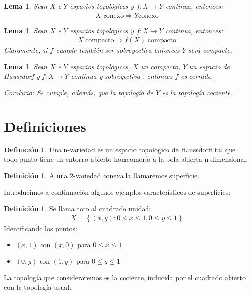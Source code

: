 \documentclass[a4paper,11pt,spanish, twoside, leqno]{tfg-uam}
\newtheorem{lema}[teor]{Lema}
\theoremstyle{definition}
\newtheorem{defin}[teor]{Definici\'on}
\begin{document}
\begin{lema}\label{lema:conexoAconexo}
	Sean $X$ e $Y$ espacios topológicos y $f: X \longrightarrow Y$ continua, entonces: 
	\begin{align*}
	X \textrm{ conexo} \Rightarrow Y \textrm{conexo}
	\end{align*}
\end{lema}


\begin{lema}\label{lema:compactoAcompacto}
	Sean $X$ e $Y$ espacios topológicos y $f: X \longrightarrow Y$ continua, entonces: 
	\begin{align*}
	X \textrm{ compacto} \Rightarrow f(X) \textrm{ compacto}
	\end{align*}
	Claramente, si $f$ cumple también ser sobreyectiva entonces $Y$ será compacto.
\end{lema} 



\begin{lema}\label{lema:XcompactoYt2fcontinua}
	Sean $X$ e  $Y$ espacios topológicos, $X$ un compacto, $Y$ un espacio de Haussdorf y $f: X \longrightarrow Y$ continua y sobreyectiva , entonces $f$ es cerrada.
	
	Corolario: Se cumple, además, que la topología de $Y$ es la topología cociente.
\end{lema}


\section{Definiciones}


\begin{defin}\label{defin:nvariedad}
	Una n-variedad es un espacio topológico de Haussdorff tal que todo punto tiene un entorno abierto homeomorfo a la bola abierta n-dimensional.
\end{defin}



\begin{defin}\label{defin:superficie}
	A una 2-variedad conexa la llamaremos superficie.
\end{defin}

Introducimos a continuación algunos ejemplos característicos de superficies:
\begin{defin}\label{defin:toro}
	Se llama toro al cuadrado unidad:
	\begin{align*}
		X = \left\{(x,y): 0\leq x\leq 1, 0\leq y\leq 1  \right\} 
	\end{align*}
	Identificando los puntos:
	\begin{itemize}
		\item 
		$(x,1)$ con $(x,0)$ para $0\leq x\leq 1$
		\item 
		$(0,y)$ con $(1,y)$ para $0\leq y\leq 1$
	\end{itemize}
La topología que consideraremos es la cociente, inducida por el cuadrado abierto con la topología usual.
\end{defin}
\end{document}
